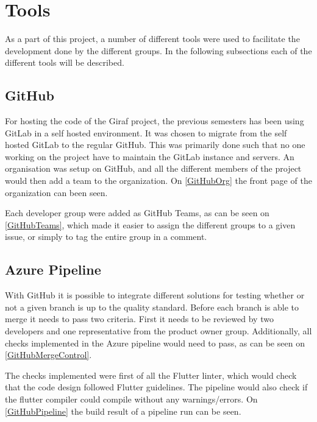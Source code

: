 \section{Tools}
As a part of this project, a number of different tools were used to facilitate the development done by the different groups.
In the following subsections each of the different tools will be described.

\subsection{GitHub}
For hosting the code of the Giraf project, the previous semesters has been using GitLab in a self hosted environment.
It was chosen to migrate from the self hosted GitLab to the regular GitHub.
This was primarily done such that no one working on the project have to maintain the GitLab instance and servers.
An organisation was setup on GitHub, and all the different members of the project would then add a team to the organization. 
On \autoref{GitHubOrg} the front page of the organization can been seen.


Each developer group were added as GitHub Teams, as can be seen on \autoref{GitHubTeams}, which made it easier to assign the different groups to a given issue, or simply to tag the entire group in a comment.


\subsection{Azure Pipeline}
With GitHub it is possible to integrate different solutions for testing whether or not a given branch is up to the quality standard.
Before each branch is able to merge it needs to pass two criteria.
First it needs to be reviewed by two developers and one representative from the product owner group.
Additionally, all checks implemented in the Azure pipeline would need to pass, as can be seen on \autoref{GitHubMergeControl}.


The checks implemented were first of all the Flutter linter, which would check that the code design followed Flutter guidelines.
The pipeline would also check if the flutter compiler could compile without any warnings/errors.
On \autoref{GitHubPipeline} the build result of a pipeline run can be seen.


